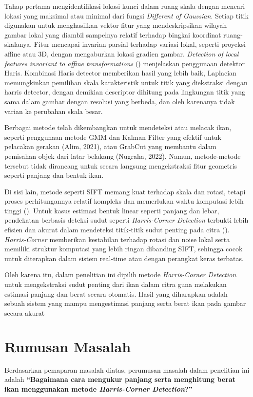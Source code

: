 Tahap pertama mengidentifikasi lokasi kunci dalam ruang skala dengan mencari lokasi yang maksimal atau minimal dari fungsi \emph{Different of Gaussian}. 
Setiap titik digunakan untuk menghasilkan vektor fitur yang mendeskripsikan wilayah gambar lokal yang diambil sampelnya relatif terhadap bingkai koordinat ruang-skalanya. Fitur mencapai invarian parsial terhadap variasi lokal, 
seperti proyeksi affine atau 3D, dengan mengaburkan lokasi gradien gambar. \emph{Detection of local features invariant to affine transformations} (\cite{Mikolajczyk2004}) menjelaskan penggunaan detektor Haris. 
Kombinasi Haris detector memberikan hasil yang lebih baik, Laplacian memungkinkan pemilihan skala karakteristik untuk titik yang diekstraksi dengan harris detector, dengan demikian descriptor dihitung pada lingkungan titik yang sama dalam gambar dengan resolusi yang berbeda, dan oleh karenanya tidak varian ke perubahan skala besar.

Berbagai metode telah dikembangkan untuk mendeteksi atau melacak ikan, seperti penggunaan metode GMM dan Kalman Filter yang efektif untuk pelacakan gerakan (Alim, 2021), atau GrabCut yang membantu dalam pemisahan objek dari latar belakang (Nugraha, 2022). 
Namun, metode-metode tersebut tidak dirancang untuk secara langsung mengekstraksi fitur geometris seperti panjang dan bentuk ikan.

Di sisi lain, metode seperti SIFT memang kuat terhadap skala dan rotasi, tetapi proses perhitungannya relatif kompleks dan memerlukan waktu komputasi lebih tinggi (\cite{Lowe2004}). 
Untuk kasus estimasi bentuk linear seperti panjang dan lebar, pendekatan berbasis deteksi sudut seperti \emph{Harris-Corner Detection} terbukti lebih efisien dan akurat dalam mendeteksi titik-titik sudut penting pada citra (\cite{Harris2013}). 
\emph{Harris-Corner} memberikan kestabilan terhadap rotasi dan noise lokal serta memiliki struktur komputasi yang lebih ringan dibanding SIFT, sehingga cocok untuk diterapkan dalam sistem real-time atau dengan perangkat keras terbatas.

Oleh karena itu, dalam penelitian ini dipilih metode \emph{Harris-Corner Detection} untuk mengekstraksi sudut penting dari ikan dalam citra guna melakukan estimasi panjang dan berat secara otomatis. 
Hasil yang diharapkan adalah sebuah sistem yang mampu mengestimasi panjang serta berat ikan pada gambar secara akurat


\section{Rumusan Masalah}
Berdasarkan pemaparan masalah diatas, perumusan masalah dalam penelitian ini adalah \textbf{“Bagaimana cara mengukur panjang serta menghitung berat ikan menggunakan metode \emph{Harris-Corner Detection}?”}

